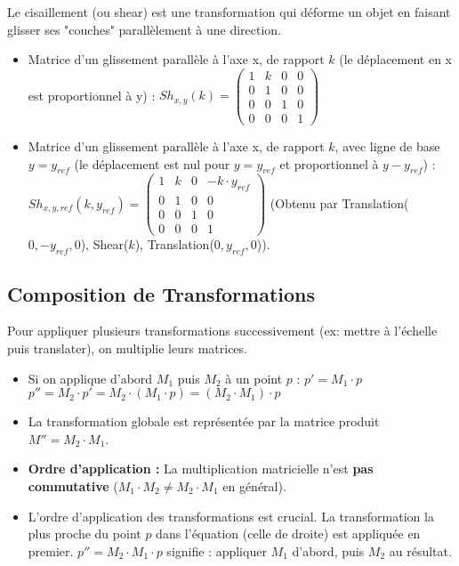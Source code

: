 \documentclass{article}
\begin{document}
Le cisaillement (ou shear) est une transformation qui déforme un objet en faisant glisser ses "couches" parallèlement à une direction.
\begin{itemize}
    \item Matrice d'un glissement parallèle à l'axe x, de rapport $k$ (le déplacement en x est proportionnel à y) :
    $Sh_{x,y}(k) = \begin{pmatrix} 1 & k & 0 & 0 \\ 0 & 1 & 0 & 0 \\ 0 & 0 & 1 & 0 \\ 0 & 0 & 0 & 1 \end{pmatrix}$
    \item Matrice d'un glissement parallèle à l'axe x, de rapport $k$, avec ligne de base $y=y_{ref}$ (le déplacement est nul pour $y=y_{ref}$ et proportionnel à $y-y_{ref}$) :
    $Sh_{x,y,ref}(k, y_{ref}) = \begin{pmatrix} 1 & k & 0 & -k \cdot y_{ref} \\ 0 & 1 & 0 & 0 \\ 0 & 0 & 1 & 0 \\ 0 & 0 & 0 & 1 \end{pmatrix}$
    (Obtenu par Translation($0, -y_{ref}, 0$), Shear($k$), Translation($0, y_{ref}, 0$)).
\end{itemize}

\subsection{Composition de Transformations}

Pour appliquer plusieurs transformations successivement (ex: mettre à l'échelle puis translater), on multiplie leurs matrices.
\begin{itemize}
    \item Si on applique d'abord $M_1$ puis $M_2$ à un point $p$ :
        $p' = M_1 \cdot p$
        $p'' = M_2 \cdot p' = M_2 \cdot (M_1 \cdot p) = (M_2 \cdot M_1) \cdot p$
    \item La transformation globale est représentée par la matrice produit $M'' = M_2 \cdot M_1$.
    \item \textbf{Ordre d'application :} La multiplication matricielle n'est \textbf{pas commutative} ($M_1 \cdot M_2 \neq M_2 \cdot M_1$ en général).
    \item L'ordre d'application des transformations est crucial. La transformation la plus proche du point $p$ dans l'équation (celle de droite) est appliquée en premier. $p'' = M_2 \cdot M_1 \cdot p$ signifie : appliquer $M_1$ d'abord, puis $M_2$ au résultat.
\end{itemize}
\end{document}
